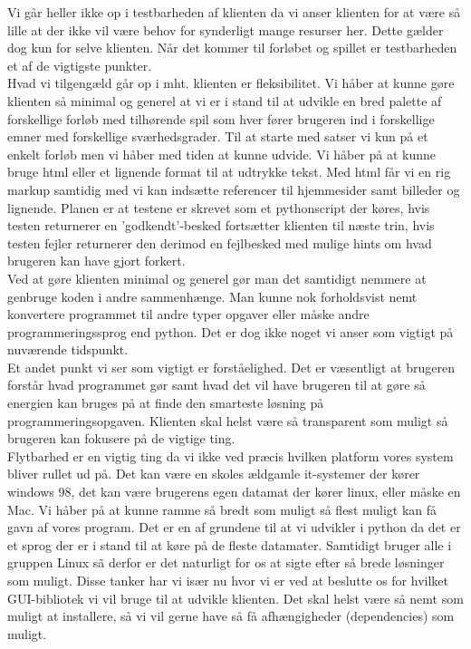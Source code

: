 \documentclass[10pt,a4paper,danish]{article}
\begin{document}
Vi går heller ikke op i testbarheden af klienten da vi anser klienten for at være så lille at der ikke vil være behov for synderligt mange resurser her. Dette gælder dog kun for selve klienten. Når det kommer til forløbet og spillet er testbarheden et af de vigtigste punkter.
\\

Hvad vi tilgengæld går op i mht. klienten er fleksibilitet. Vi håber at kunne gøre klienten så minimal og generel at vi er i stand til at udvikle en bred palette af forskellige forløb med tilhørende spil som hver fører brugeren ind i forskellige emner med forskellige sværhedsgrader. Til at starte med satser vi kun på et enkelt forløb men vi håber med tiden at kunne udvide. Vi håber på at kunne bruge html eller et lignende format til at udtrykke tekst. Med html får vi en rig markup samtidig med vi kan indsætte referencer til hjemmesider samt billeder og lignende. Planen er at testene er skrevet som et pythonscript der køres, hvis testen returnerer en 'godkendt'-besked fortsætter klienten til næste trin, hvis testen fejler returnerer den derimod en fejlbesked med mulige hints om hvad brugeren kan have gjort forkert.
\\

Ved at gøre klienten minimal og generel gør man det samtidigt nemmere at genbruge koden i andre sammenhænge. Man kunne nok forholdsvist nemt konvertere programmet til andre typer opgaver eller måske andre programmeringssprog end python. Det er dog ikke noget vi anser som vigtigt på nuværende tidspunkt.
\\

Et andet punkt vi ser som vigtigt er forståelighed. Det er væsentligt at brugeren forstår hvad programmet gør samt hvad det vil have brugeren til at gøre så energien kan bruges på at finde den smarteste løsning på programmeringsopgaven.
Klienten skal helst være så transparent som muligt så brugeren kan fokusere på de vigtige ting.
\\

Flytbarhed er en vigtig ting da vi ikke ved præcis hvilken platform vores system bliver rullet ud på. Det kan være en skoles ældgamle it-systemer der kører windows 98, det kan være brugerens egen datamat der kører linux, eller måske en Mac.
Vi håber på at kunne ramme så bredt som muligt så flest muligt kan få gavn af vores program. Det er en af grundene til at vi udvikler i python da det er et sprog der er i stand til at køre på de fleste datamater. Samtidigt bruger alle i gruppen Linux sã derfor er det naturligt for os at sigte efter så brede løsninger som muligt. Disse tanker har vi især nu hvor vi er ved at beslutte os for hvilket GUI-bibliotek vi vil bruge til at udvikle klienten. Det skal helst være så nemt som muligt at installere, så vi vil gerne have så få afhængigheder (dependencies) som muligt.
\\
\end{document}
